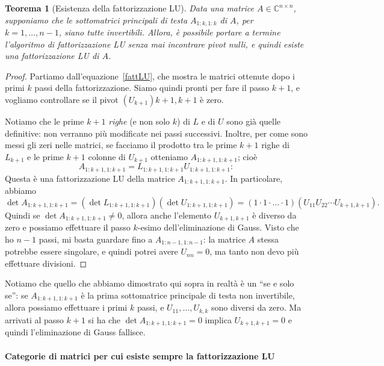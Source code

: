 \documentclass[a4paper]{report}
\newtheorem{theorem}{Teorema}[chapter]
\theoremstyle{definiton}
\theoremstyle{remark}
\begin{document}
\begin{theorem}[Esistenza della fattorizzazione LU]
Data una matrice $A\in\mathbb{C}^{n\times n}$, supponiamo che le sottomatrici principali di testa $A_{1:k,1:k}$ di $A$, per $k=1,\dots,n-1$, siano tutte invertibili. Allora, è possibile portare a termine l'algoritmo di fattorizzazione LU senza mai incontrare pivot nulli, e quindi esiste una fattorizzazione LU di $A$.
\end{theorem}
\begin{proof}
Partiamo dall'equazione~\eqref{fattLU}, che mostra le matrici ottenute dopo i primi $k$ passi della fattorizzazione. Siamo quindi pronti per fare il passo $k+1$, e vogliamo controllare se il pivot $(U_{k+1}){k+1,k+1}$ è zero.

Notiamo che le prime $k+1$ \emph{righe} (e non solo $k$) di $L$ e di $U$ sono già quelle definitive: non verranno più modificate nei passi successivi. Inoltre, per come sono messi gli zeri nelle matrici, se facciamo il prodotto tra le prime $k+1$ righe di $L_{k+1}$ e le prime $k+1$ colonne di $U_{k+1}$ otteniamo $A_{1:k+1,1:k+1}$; cioè
\[
A_{1:k+1,1:k+1} = L_{1:k+1,1:k+1} U_{1:k+1,1:k+1}:
\]
Questa è una fattorizzazione LU della matrice $A_{1:k+1,1:k+1}$. In particolare, abbiamo
\[
\det A_{1:k+1,1:k+1} = (\det L_{1:k+1,1:k+1}) (\det U_{1:k+1,1:k+1}) = (1\cdot 1 \cdot \dots \cdot 1) (U_{11}U_{22}\cdots U_{k+1,k+1}).
\]
Quindi se $\det A_{1:k+1,1:k+1} \neq 0$, allora anche l'elemento $U_{k+1,k+1}$ è diverso da zero e possiamo effettuare il passo $k$-esimo dell'eliminazione di Gauss. Visto che ho $n-1$ passi, mi basta guardare fino a $A_{1:n-1,1:n-1}$: la matrice $A$ stessa potrebbe essere singolare, e quindi potrei avere $U_{nn}=0$, ma tanto non devo più effettuare divisioni.
\end{proof}
Notiamo che quello che abbiamo dimostrato qui sopra in realtà è un ``se e solo se'': se $A_{1:k+1,1:k+1}$ è la prima sottomatrice principale di testa non invertibile, allora possiamo effettuare i primi $k$ passi, e $U_{11},\dots,U_{k,k}$ sono diversi da zero. Ma arrivati al passo $k+1$ si ha che $\det A_{1:k+1,1:k+1} = 0$ implica $U_{k+1,k+1}=0$ e quindi l'eliminazione di Gauss fallisce.

\paragraph{Categorie di matrici per cui esiste sempre la fattorizzazione LU}
\end{document}
